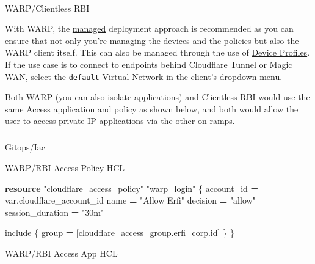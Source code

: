 \documentclass[
]{article}
\makeatletter
\let\oldparagraph\paragraph
\renewcommand{\paragraph}{
    \@ifstar
      \xxxParagraphStar
      \xxxParagraphNoStar
  }
\newcommand{\xxxParagraphStar}[1]{\oldparagraph*{#1}\mbox{}}
\newcommand{\xxxParagraphNoStar}[1]{\oldparagraph{#1}\mbox{}}
\let\oldsubparagraph\subparagraph
\renewcommand{\subparagraph}{
    \@ifstar
      \xxxSubParagraphStar
      \xxxSubParagraphNoStar
  }
\newcommand{\xxxSubParagraphStar}[1]{\oldsubparagraph*{#1}\mbox{}}
\newcommand{\xxxSubParagraphNoStar}[1]{\oldsubparagraph{#1}\mbox{}}
\newenvironment{Shaded}{\begin{snugshade}}{\end{snugshade}}
\newcommand{\KeywordTok}[1]{\textcolor[rgb]{0.13,0.29,0.53}{\textbf{#1}}}
\newcommand{\NormalTok}[1]{#1}
\newcommand{\OperatorTok}[1]{\textcolor[rgb]{0.81,0.36,0.00}{\textbf{#1}}}
\newcommand{\StringTok}[1]{\textcolor[rgb]{0.31,0.60,0.02}{#1}}
\newcommand{\VariableTok}[1]{\textcolor[rgb]{0.00,0.00,0.00}{#1}}
\makeatother
\begin{document}
\paragraph{WARP/Clientless RBI}\label{warpclientless-rbi}

With WARP, the
\href{https://developers.cloudflare.com/cloudflare-one/connections/connect-devices/warp/deployment/mdm-deployment/}{managed}
deployment approach is recommended as you can ensure that not only
you're managing the devices and the policies but also the WARP client
itself. This can also be managed through the use of
\href{https://developers.cloudflare.com/cloudflare-one/connections/connect-devices/warp/configure-warp/device-profiles/}{Device
Profiles}. If the use case is to connect to endpoints behind Cloudflare
Tunnel or Magic WAN, select the \texttt{default}
\href{https://developers.cloudflare.com/cloudflare-one/connections/connect-networks/private-net/cloudflared/tunnel-virtual-networks/}{Virtual
Network} in the client's dropdown menu.

Both WARP (you can also isolate applications) and
\href{https://developers.cloudflare.com/cloudflare-one/policies/browser-isolation/setup/clientless-browser-isolation/\#clientless-web-isolation}{Clientless
RBI} would use the same Access application and policy as shown below,
and both would allow the user to access private IP applications via the
other on-ramps.

\subparagraph{Gitops/Iac}\label{gitopsiac-1}

WARP/RBI Access Policy HCL

\begin{Shaded}
\begin{Highlighting}[numbers=left,,]
\KeywordTok{resource} \StringTok{"cloudflare\_access\_policy"} \StringTok{"warp\_login"}\NormalTok{ \{}
\NormalTok{  account\_id       }\OperatorTok{=} \VariableTok{var}\NormalTok{.cloudflare\_account\_id}
\NormalTok{  name             }\OperatorTok{=} \StringTok{"Allow Erfi"}
\NormalTok{  decision         }\OperatorTok{=} \StringTok{"allow"}
\NormalTok{  session\_duration }\OperatorTok{=} \StringTok{"30m"}
 
\NormalTok{  include \{}
\NormalTok{    group }\OperatorTok{=}\NormalTok{ [cloudflare\_access\_group.erfi\_corp.id]}
\NormalTok{  \}}
\NormalTok{\}}
\end{Highlighting}
\end{Shaded}

\newpage{}

WARP/RBI Access App HCL
\end{document}
